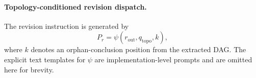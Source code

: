     \paragraph{Topology-conditioned revision dispatch.}
    The revision instruction is generated by
    \begin{equation}
    \label{eq:topo_pr}
    P_r=\psi(r_{\mathrm{out}},q_{\mathrm{topo}},k),
    \end{equation}
    where $k$ denotes an orphan-conclusion position from the extracted DAG.
    The explicit text templates for $\psi$ are implementation-level prompts and are omitted here for brevity.
    
    
    
    
